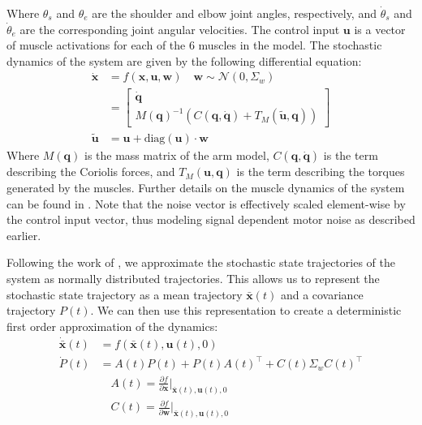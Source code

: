 \documentclass[letterpaper, 10pt, conference]{ieeeconf}
\begin{document}
Where $\theta_s$ and $\theta_e$ are the shoulder and elbow joint angles, respectively, and $\dot{\theta}_s$ and $\dot{\theta}_e$ are the corresponding joint angular velocities. The control input $\mathbf{u}$ is a vector of muscle activations for each of the 6 muscles in the model. The stochastic dynamics of the system are given by the following differential equation:
\begin{align}
    \dot{\mathbf{x}} &= f(\mathbf{x}, \mathbf{u}, \mathbf{w}) \quad \mathbf{w} \sim \mathcal{N}(0, \Sigma_w) \\
    &= \begin{bmatrix}
        \dot{\mathbf{q}} \\
        M(\mathbf{q})^{-1} \left(C(\mathbf{q}, \dot{\mathbf{q}}) + T_M(\tilde{\mathbf{u}}, \mathbf{q})\right)
    \end{bmatrix} \\
    \tilde{\mathbf{u}} &= \mathbf{u} + \text{diag}(\mathbf{u}) \cdot \mathbf{w}
\end{align}
Where $M(\mathbf{q})$ is the mass matrix of the arm model, $C(\mathbf{q}, \dot{\mathbf{q}})$ is the term describing the Coriolis forces, and $T_M(\mathbf{u}, \mathbf{q})$ is the term describing the torques generated by the muscles. Further details on the muscle dynamics of the system can be found in \cite{stochastic_model}. Note that the noise vector is effectively scaled element-wise by the control input vector, thus modeling signal dependent motor noise as described earlier.

Following the work of \cite{stochastic_model}, we approximate the stochastic state trajectories of the system as normally distributed trajectories. This allows us to represent the stochastic state trajectory as a mean trajectory $\mathbf{\bar{x}}(t)$ and a covariance trajectory $P(t)$. We can then use this representation to create a deterministic first order approximation of the dynamics: 
\begin{align*}
    \mathbf{\dot{\bar{x}}}(t) &= f(\mathbf{\bar{x}}(t), \mathbf{u}(t), 0) \\
    \dot{P}(t) &= A(t)P(t) + P(t)A(t)^\top + C(t) \Sigma_w C(t)^\top \\
    &\quad A(t) = \frac{\partial f}{\partial \mathbf{x}}\bigg|_{\mathbf{\bar{x}}(t), \mathbf{u}(t), 0} \\
    &\quad C(t) = \frac{\partial f}{\partial \mathbf{w}}\bigg|_{\mathbf{\bar{x}}(t), \mathbf{u}(t), 0}
\end{align*}
\end{document}
